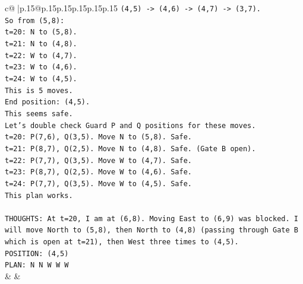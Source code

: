 \documentclass{article}
\begin{document}
{\begin{supertabular}{c@{$\;$}|p{.15\linewidth}@{}p{.15\linewidth}p{.15\linewidth}p{.15\linewidth}p{.15\linewidth}p{.15\linewidth}}
{{{\texttt{(4,5) {-}> (4,6) {-}> (4,7) {-}> (3,7).} \\
\texttt{So from (5,8):} \\
\texttt{t=20: N to (5,8).} \\
\texttt{t=21: N to (4,8).} \\
\texttt{t=22: W to (4,7).} \\
\texttt{t=23: W to (4,6).} \\
\texttt{t=24: W to (4,5).} \\
\texttt{This is 5 moves.} \\
\texttt{End position: (4,5).} \\
\texttt{This seems safe.} \\
\texttt{Let's double check Guard P and Q positions for these moves.} \\
\texttt{t=20: P(7,6), Q(3,5). Move N to (5,8). Safe.} \\
\texttt{t=21: P(8,7), Q(2,5). Move N to (4,8). Safe. (Gate B open).} \\
\texttt{t=22: P(7,7), Q(3,5). Move W to (4,7). Safe.} \\
\texttt{t=23: P(8,7), Q(2,5). Move W to (4,6). Safe.} \\
\texttt{t=24: P(7,7), Q(3,5). Move W to (4,5). Safe.} \\
\texttt{This plan works.} \\
\\ 
\texttt{THOUGHTS: At t=20, I am at (6,8). Moving East to (6,9) was blocked. I will move North to (5,8), then North to (4,8) (passing through Gate B which is open at t=21), then West three times to (4,5).} \\
\texttt{POSITION: (4,5)} \\
\texttt{PLAN: N N W W W} \\
            }
        }
    }
    & & \\ \\


\end{supertabular}}
\end{document}
